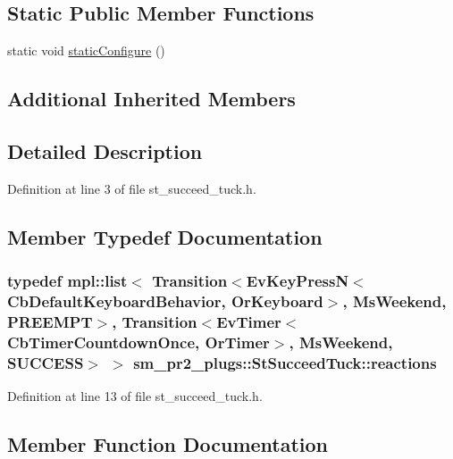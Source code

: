 \subsection*{Static Public Member Functions}
\begin{DoxyCompactItemize}
\item 
static void \hyperlink{structsm__pr2__plugs_1_1StSucceedTuck_a2578c44b2fa3443560def76f6d2bdef3}{static\+Configure} ()
\end{DoxyCompactItemize}
\subsection*{Additional Inherited Members}


\subsection{Detailed Description}


Definition at line 3 of file st\+\_\+succeed\+\_\+tuck.\+h.



\subsection{Member Typedef Documentation}
\subsubsection[{\texorpdfstring{reactions}{reactions}}]{\setlength{\rightskip}{0pt plus 5cm}typedef mpl\+::list$<$ Transition$<$Ev\+Key\+PressN$<$Cb\+Default\+Keyboard\+Behavior, {\bf Or\+Keyboard}$>$, {\bf Ms\+Weekend}, {\bf P\+R\+E\+E\+M\+PT}$>$, Transition$<$Ev\+Timer$<$Cb\+Timer\+Countdown\+Once, {\bf Or\+Timer}$>$, {\bf Ms\+Weekend}, {\bf S\+U\+C\+C\+E\+SS}$>$ $>$ {\bf sm\+\_\+pr2\+\_\+plugs\+::\+St\+Succeed\+Tuck\+::reactions}}\hypertarget{structsm__pr2__plugs_1_1StSucceedTuck_a29335cc5a0453dcd24688f4b4fc19993}{}\label{structsm__pr2__plugs_1_1StSucceedTuck_a29335cc5a0453dcd24688f4b4fc19993}


Definition at line 13 of file st\+\_\+succeed\+\_\+tuck.\+h.



\subsection{Member Function Documentation}
